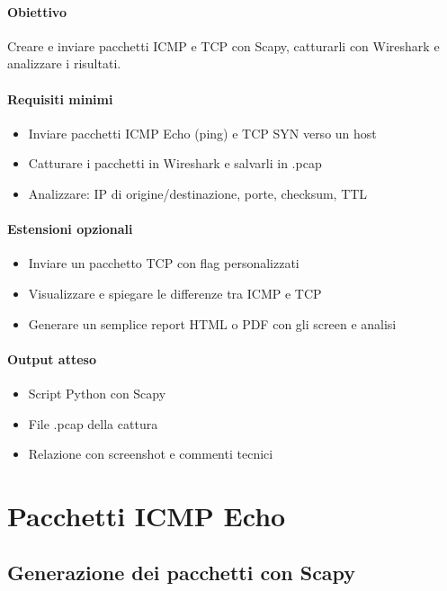 \documentclass[12pt,a4paper]{report}
\begin{document}
\subsubsection{Obiettivo}
Creare e inviare pacchetti ICMP e TCP con Scapy, catturarli con Wireshark e analizzare i risultati.

\subsubsection{Requisiti minimi}
\begin{itemize}
	\item Inviare pacchetti ICMP Echo (ping) e TCP SYN verso un host
	\item Catturare i pacchetti in Wireshark e salvarli in .pcap
	\item Analizzare: IP di origine/destinazione, porte, checksum, TTL
\end{itemize}

\subsubsection{Estensioni opzionali}
\begin{itemize}
	\item Inviare un pacchetto TCP con flag personalizzati
	\item Visualizzare e spiegare le differenze tra ICMP e TCP
	\item Generare un semplice report HTML o PDF con gli screen e analisi
\end{itemize}

\subsubsection{Output atteso}

\begin{itemize}
	\item Script Python con Scapy
	\item File .pcap della cattura
	\item Relazione con screenshot e commenti tecnici
\end{itemize}

\chapter{Pacchetti ICMP Echo}

\section{Generazione dei pacchetti con Scapy}
\end{document}
